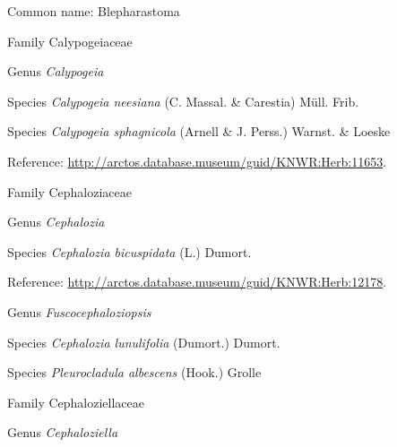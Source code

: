 \documentclass[9pt, article]{memoir}
\begin{document}
\begin{multicols}{2}
Common name: Blepharastoma

\vspace{6pt}\noindent\hspace{24pt}Family Calypogeiaceae


\vspace{6pt}\noindent\hspace{30pt}Genus \textit{Calypogeia}


\vspace{6pt}\noindent\hspace{36pt}Species \textit{Calypogeia neesiana} (C. Massal. \& Carestia) Müll. Frib.


\vspace{6pt}\noindent\hspace{36pt}Species \textit{Calypogeia sphagnicola} (Arnell \& J. Perss.) Warnst. \& Loeske


Reference: 
\url{http://arctos.database.museum/guid/KNWR:Herb:11653}.

\vspace{6pt}\noindent\hspace{24pt}Family Cephaloziaceae


\vspace{6pt}\noindent\hspace{30pt}Genus \textit{Cephalozia}


\vspace{6pt}\noindent\hspace{36pt}Species \textit{Cephalozia bicuspidata} (L.) Dumort.


Reference: 
\url{http://arctos.database.museum/guid/KNWR:Herb:12178}.

\vspace{6pt}\noindent\hspace{30pt}Genus \textit{Fuscocephaloziopsis}


\vspace{6pt}\noindent\hspace{36pt}Species \textit{Cephalozia lunulifolia} (Dumort.) Dumort.


\vspace{6pt}\noindent\hspace{36pt}Species \textit{Pleurocladula albescens} (Hook.) Grolle


\vspace{6pt}\noindent\hspace{24pt}Family Cephaloziellaceae


\vspace{6pt}\noindent\hspace{30pt}Genus \textit{Cephaloziella}



\end{multicols}
\end{document}
